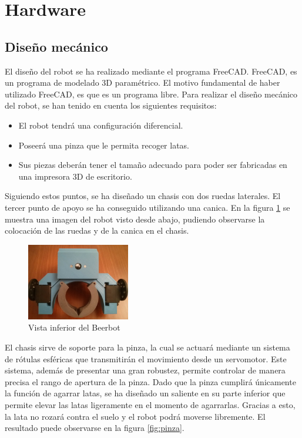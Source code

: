 \section{Hardware}
\label{hardware}


\subsection{Diseño mecánico}

El diseño del robot se ha realizado mediante el programa FreeCAD. FreeCAD, es un programa de modelado 3D paramétrico. El motivo fundamental de haber utilizado FreeCAD, es que es un programa libre. Para realizar el diseño mecánico del robot, se han tenido en cuenta los siguientes requisitos:

\begin{itemize}
	\item El robot tendrá una configuración diferencial.
	\item Poseerá una pinza que le permita recoger latas.
	\item Sus piezas deberán tener el tamaño adecuado para poder ser fabricadas en una impresora 3D de escritorio.
\end{itemize}

Siguiendo estos puntos, se ha diseñado un chasis con dos ruedas laterales. El tercer punto de apoyo se ha conseguido utilizando una canica. En la figura \ref{fig:abajo} se muestra una imagen del robot visto desde abajo, pudiendo observarse la colocación de las ruedas y de la canica en el chasis.

\begin{figure}[H]
        \centering
        \includegraphics[width=0.4\textwidth]{images/abajo.jpg}
        \caption{Vista inferior del Beerbot}
        \label{fig:abajo}
\end{figure} 
El chasis sirve de soporte para la pinza, la cual se actuará mediante un sistema de rótulas esféricas que transmitirán el movimiento desde un servomotor. Este sistema, además de presentar una gran robustez, permite controlar de manera precisa el rango de apertura de la pinza. Dado que la pinza cumplirá únicamente la función de agarrar latas, se ha diseñado un saliente en su parte inferior que permite elevar las latas ligeramente en el momento de agarrarlas. Gracias a esto, la lata no rozará contra el suelo y el robot podrá moverse libremente. El resultado puede observarse en la figura \ref{fig:pinza}.


